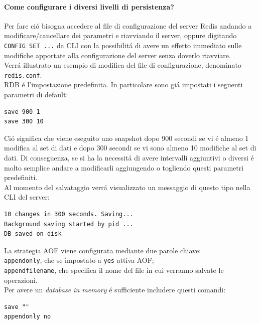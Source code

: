 \paragraph{Come configurare i diversi livelli di persistenza?\\}
Per fare ció bisogna accedere al file di configurazione del server Redis andando a modificare/cancellare dei parametri e riavviando il server,
oppure digitando \texttt{CONFIG SET ...} da CLI con la possibilitá di avere un effetto immediato sulle modifiche apportate alla configurazione del server senza doverlo riavviare.\\
Verrá illustrato un esempio di modifica del file di configurazione, denominato \texttt{redis.conf}.\\

RDB é l'impostazione predefinita. In particolare sono giá impostati i seguenti parametri di default:
\begin{lstlisting}[autogobble]
save 900 1
save 300 10\end{lstlisting}
Ció significa che viene eseguito uno snapshot dopo 900 secondi se vi é almeno 1 modifica al set di dati e dopo
300 secondi se vi sono almeno 10 modifiche al set di dati.
Di conseguenza, se si ha la necessitá di avere intervalli aggiuntivi o diversi é molto semplice andare a modificarli aggiungendo o togliendo questi parametri predefiniti.\\

Al momento del salvataggio verrá visualizzato un messaggio di questo tipo nella CLI del server:
\begin{lstlisting}[autogobble]
10 changes in 300 seconds. Saving...
Background saving started by pid ...
DB saved on disk\end{lstlisting}


La strategia AOF viene configurata mediante due parole chiave:\\
\texttt{appendonly}, che se impostato a \texttt{yes} attiva AOF;\\
\texttt{appendfilename}, che specifica il nome del file in cui verranno salvate le operazioni.\\

Per avere un \emph{database in memory} é sufficiente includere questi comandi:
\begin{lstlisting}[autogobble]
save ""
appendonly no\end{lstlisting}


